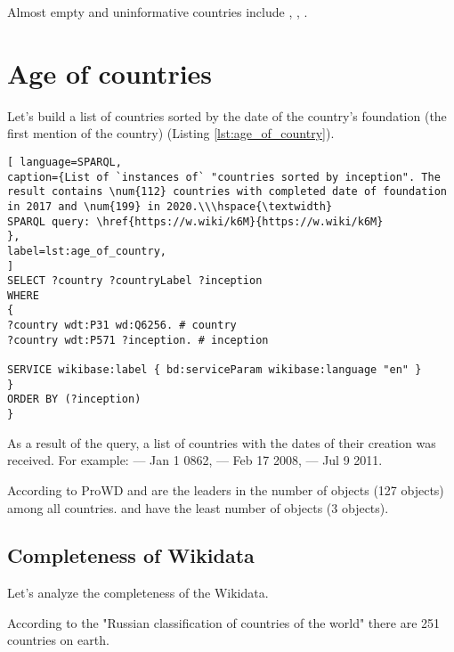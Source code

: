 Almost empty and uninformative countries include , , .


\section{Age of countries}

Let's build a list of countries sorted by the date of the country's foundation (the first mention of the country) (Listing \ref{lst:age_of_country}).

\begin{lstlisting}[ language=SPARQL, 
caption={List of `instances of` "countries sorted by inception". The result contains \num{112} countries with completed date of foundation in 2017 and \num{199} in 2020.\\\hspace{\textwidth}
SPARQL query: \href{https://w.wiki/k6M}{https://w.wiki/k6M}
},
label=lst:age_of_country, 					
]
SELECT ?country ?countryLabel ?inception
WHERE
{
?country wdt:P31 wd:Q6256. # country
?country wdt:P571 ?inception. # inception

SERVICE wikibase:label { bd:serviceParam wikibase:language "en" }
}
ORDER BY (?inception)
}
\end{lstlisting}


As a result of the query, a list of countries with the dates of their creation was received. For example:  --- Jan 1 0862,  --- Feb 17 2008,  --- Jul 9 2011.

According to ProWD  and  are the leaders in the number of objects (127 objects) among all countries.  and  have the least number of objects (3 objects).


\subsection{Completeness of Wikidata}

Let's analyze the completeness of the Wikidata.

According to the "Russian classification of countries of the world" there are 251 countries on earth.

